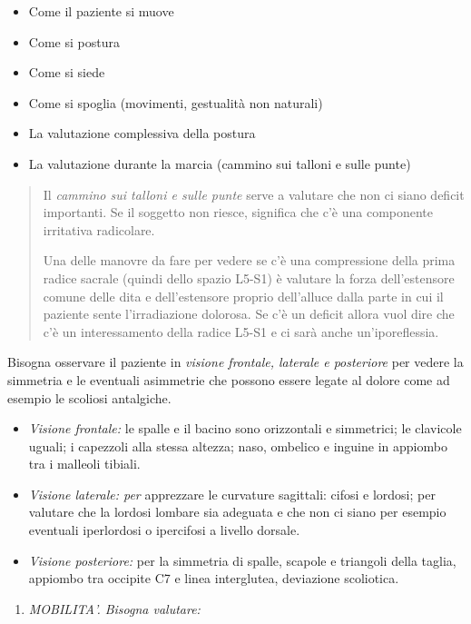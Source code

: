 \documentclass[]{article}
\begin{document}
\begin{itemize}
\item
  Come il paziente si muove
\item
  Come si postura
\item
  Come si siede
\item
  Come si spoglia (movimenti, gestualità non naturali)
\item
  La valutazione complessiva della postura
\item
  La valutazione durante la marcia (cammino sui talloni e sulle punte)
\end{itemize}

\begin{quote}
Il \emph{\emph{cammino sui talloni e sulle punte}} serve a valutare che
non ci siano deficit importanti. Se il soggetto non riesce, significa
che c'è una componente irritativa radicolare.

Una delle manovre da fare per vedere se c'è una compressione della prima
radice sacrale (quindi dello spazio L5-S1) è valutare la forza
dell'estensore comune delle dita e dell'estensore proprio dell'alluce
dalla parte in cui il paziente sente l'irradiazione dolorosa. Se c'è un
deficit allora vuol dire che c'è un interessamento della radice L5-S1 e
ci sarà anche un'iporeflessia.
\end{quote}

Bisogna osservare il paziente in \emph{visione frontale, laterale e
posteriore} per vedere la simmetria e le eventuali asimmetrie che
possono essere legate al dolore come ad esempio le scoliosi antalgiche.

\begin{itemize}
\item
  \emph{Visione frontale:} le spalle e il bacino sono orizzontali e
  simmetrici; le clavicole uguali; i capezzoli alla stessa altezza;
  naso, ombelico e inguine in appiombo tra i malleoli tibiali.
\item
  \emph{Visione l\emph{aterale: per}} apprezzare le curvature sagittali:
  cifosi e lordosi; per valutare che la lordosi lombare sia adeguata e
  che non ci siano per esempio eventuali iperlordosi o ipercifosi a
  livello dorsale.
\item
  \emph{Visione posteriore:} per la simmetria di spalle, scapole e
  triangoli della taglia, appiombo tra occipite C7 e linea interglutea,
  deviazione scoliotica.
\end{itemize}

\begin{enumerate}
\def\labelenumi{\arabic{enumi}.}
\item
  \emph{MOBILITA'. Bisogna valutare:}
\end{enumerate}
\end{document}
